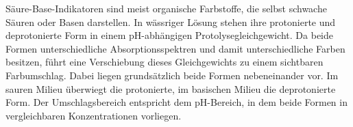 Säure-Base-Indikatoren sind meist organische Farbstoffe, die selbst schwache Säuren oder Basen darstellen. In wässriger Lösung stehen ihre protonierte und deprotonierte Form in einem pH-abhängigen Protolysegleichgewicht. Da beide Formen unterschiedliche Absorptionsspektren und damit unterschiedliche Farben besitzen, führt eine Verschiebung dieses Gleichgewichts zu einem sichtbaren Farbumschlag. Dabei liegen grundsätzlich beide Formen nebeneinander vor. Im sauren Milieu überwiegt die protonierte, im basischen Milieu die deprotonierte Form. Der Umschlagsbereich entspricht dem pH-Bereich, in dem beide Formen in vergleichbaren Konzentrationen vorliegen. \cite{skript}

\newpage

